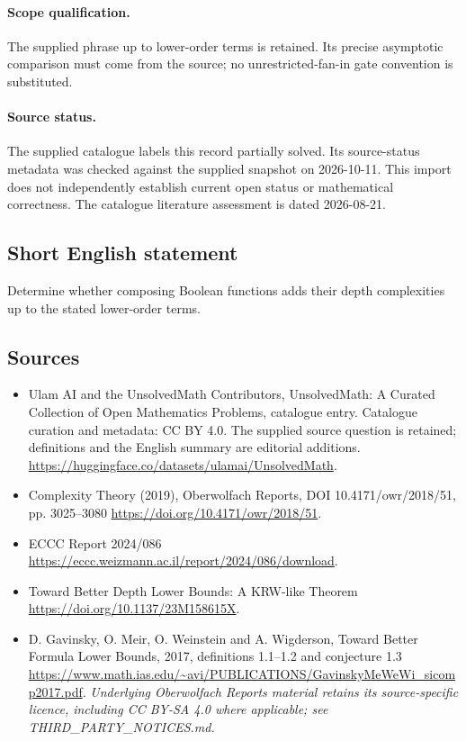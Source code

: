 \documentclass[11pt]{article}
\begin{document}
\paragraph{Scope qualification.}
The supplied phrase up to lower-order terms is retained. Its precise asymptotic comparison must come from the source; no unrestricted-fan-in gate convention is substituted.
\paragraph{Source status.}
The supplied catalogue labels this record partially solved. Its source-status metadata was checked against the supplied snapshot on 2026-10-11. This import does not independently establish current open status or mathematical correctness. The catalogue literature assessment is dated 2026-08-21.
\subsection{Short English statement}
Determine whether composing Boolean functions adds their depth complexities up to the stated lower-order terms.
\subsection{Sources}
\begin{itemize}
\item[S1] Ulam AI and the UnsolvedMath Contributors, UnsolvedMath: A Curated Collection of Open Mathematics Problems, catalogue entry. Catalogue curation and metadata: CC BY 4.0. The supplied source question is retained; definitions and the English summary are editorial additions.
\url{https://huggingface.co/datasets/ulamai/UnsolvedMath}.
\item[S2] Complexity Theory (2019), Oberwolfach Reports, DOI 10.4171/owr/2018/51, pp. 3025--3080
\url{https://doi.org/10.4171/owr/2018/51}.
\item[S3] ECCC Report 2024/086
\url{https://eccc.weizmann.ac.il/report/2024/086/download}.
\item[S4] Toward Better Depth Lower Bounds: A KRW-like Theorem
\url{https://doi.org/10.1137/23M158615X}.
\item[S5] D. Gavinsky, O. Meir, O. Weinstein and A. Wigderson, Toward Better Formula Lower Bounds, 2017, definitions 1.1--1.2 and conjecture 1.3
\url{https://www.math.ias.edu/~avi/PUBLICATIONS/GavinskyMeWeWi_sicomp2017.pdf}.
\textit{Underlying Oberwolfach Reports material retains its source-specific licence, including CC BY-SA 4.0 where applicable; see THIRD\_PARTY\_NOTICES.md.}
\end{itemize}
\end{document}
